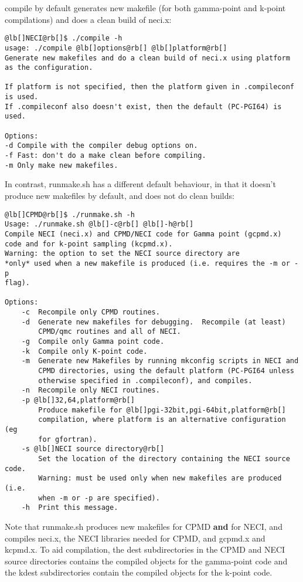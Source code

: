 \documentclass[openany,a4paper,10pt]{manual}
\begin{document}
compile by default generates new makefile (for both gamma-point and
k-point compilations) and does a clean build of neci.x:

\begin{Verbatim}[commandchars=@\[\]]
@lb[]NECI@rb[]$ ./compile -h
usage: ./compile @lb[]options@rb[] @lb[]platform@rb[]
Generate new makefiles and do a clean build of neci.x using platform as the configuration.

If platform is not specified, then the platform given in .compileconf is used.
If .compileconf also doesn't exist, then the default (PC-PGI64) is used.

Options:
-d Compile with the compiler debug options on.
-f Fast: don't do a make clean before compiling.
-m Only make new makefiles.
\end{Verbatim}

In contrast, runmake.sh has a different default behaviour, in that it
doesn't produce new makefiles by default, and does not do clean builds:

\begin{Verbatim}[commandchars=@\[\]]
@lb[]CPMD@rb[]$ ./runmake.sh -h
Usage: ./runmake.sh @lb[]-c@rb[] @lb[]-h@rb[]
Compile NECI (neci.x) and CPMD/NECI code for Gamma point (gcpmd.x)
code and for k-point sampling (kcpmd.x).
Warning: the option to set the NECI source directory are
*only* used when a new makefile is produced (i.e. requires the -m or -p
flag).

Options:
    -c  Recompile only CPMD routines.
    -d  Generate new makefiles for debugging.  Recompile (at least)
        CPMD/qmc routines and all of NECI.
    -g  Compile only Gamma point code.
    -k  Compile only K-point code.
    -m  Generate new Makefiles by running mkconfig scripts in NECI and
        CPMD directories, using the default platform (PC-PGI64 unless
        otherwise specified in .compileconf), and compiles.
    -n  Recompile only NECI routines.
    -p @lb[]32,64,platform@rb[]
        Produce makefile for @lb[]pgi-32bit,pgi-64bit,platform@rb[]
        compilation, where platform is an alternative configuration (eg
        for gfortran).
    -s @lb[]NECI source directory@rb[]
        Set the location of the directory containing the NECI source code.
        Warning: must be used only when new makefiles are produced (i.e.
        when -m or -p are specified).
    -h  Print this message.
\end{Verbatim}

Note that runmake.sh produces new makefiles for CPMD \textbf{and} for NECI,
and compiles neci.x, the NECI libraries needed for CPMD, and gcpmd.x
and kcpmd.x.  To aid compilation, the dest subdirectories in the CPMD and
NECI source directories contains the compiled objects for the gamma-point
code and the kdest subdirectories contain the compiled objects for the
k-point code.
\end{document}
